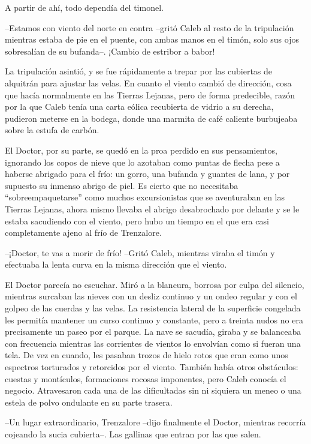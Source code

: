 A partir de ahí, todo dependía del timonel.
 
--Estamos con viento del norte en contra --gritó Caleb al resto de la tripulación mientras estaba de pie en el puente, con ambas manos en el timón, solo sus ojos sobresalían de su bufanda--. ¡Cambio de estribor a babor!
 
La tripulación asintió, y se fue rápidamente a trepar por las cubiertas de alquitrán para ajustar las velas. En cuanto el viento cambió de dirección, cosa que hacía normalmente en las Tierras Lejanas, pero de forma predecible, razón por la que Caleb tenía una carta eólica recubierta de vidrio a su derecha, pudieron meterse en la bodega, donde una marmita de café caliente burbujeaba sobre la estufa de carbón.
 
El Doctor, por su parte, se quedó en la proa perdido en sus pensamientos, ignorando los copos de nieve que lo azotaban como puntas de flecha pese a  haberse abrigado para el frío: un gorro, una bufanda y guantes de lana, y por supuesto su inmenso abrigo de piel. Es cierto que no necesitaba ``sobreempaquetarse'' como muchos excursionistas que se aventuraban en las Tierras Lejanas, ahora mismo llevaba el abrigo desabrochado por delante y se le estaba sacudiendo con el viento, pero hubo un tiempo en el que era casi completamente ajeno al frío de Trenzalore.
 
--¡Doctor, te vas a morir de frío! --Gritó Caleb, mientras viraba el timón y efectuaba la lenta curva en la misma dirección que el viento.
 
El Doctor parecía no escuchar. Miró a la blancura, borrosa por culpa del silencio, mientras surcaban las nieves con un desliz continuo y un ondeo regular y con el golpeo de las cuerdas y las velas. La resistencia lateral de la superficie congelada les permitía mantener un curso continuo y constante, pero a treinta nudos no era precisamente un paseo por el parque. La nave se sacudía, giraba y se balanceaba con frecuencia mientras las corrientes de vientos lo envolvían como si fueran una tela. De vez en cuando, les pasaban trozos de hielo rotos que eran como unos espectros torturados y retorcidos por el viento. También había otros obstáculos: cuestas y montículos, formaciones rocosas imponentes, pero Caleb conocía el negocio. Atravesaron cada una de las dificultadas sin ni siquiera un meneo o una estela de polvo ondulante en su parte trasera.
 
--Un lugar extraordinario, Trenzalore --dijo finalmente el Doctor, mientras recorría cojeando la sucia cubierta--. Las gallinas que entran por las que salen.
 
